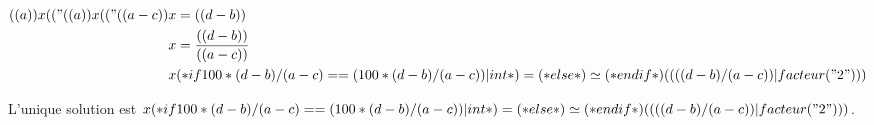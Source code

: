 \exercice*

\begin{align*}
  (( a )) x (( "%
  (( a )) x (( "%
  (( a - c )) x &= (( d - b )) \\
  x &= \frac{(( d - b ))}{(( a - c ))} \\
  x &
        (* if 100*(d-b)/(a-c) == (100*(d-b)/(a-c))|int *)
            =
        (* else *)
            \simeq
        (* endif *)
        (( ((d-b)/(a-c))|facteur("2") ))
\end{align*}

L'unique solution est
$x
(* if 100*(d-b)/(a-c) == (100*(d-b)/(a-c))|int *)
    =
(* else *)
    \simeq
(* endif *)
(( ((d-b)/(a-c))|facteur("2") ))$.
